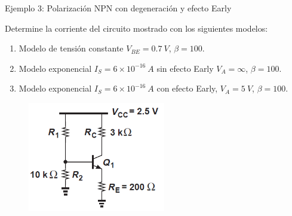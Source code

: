\documentclass[t,aspectratio=169]{beamer}
\begin{document}
\begin{frame}{Ejemplo 3: Polarización NPN con degeneración y efecto Early}

Determine la corriente del circuito mostrado con los siguientes modelos:

\begin{enumerate}
    \item Modelo de tensión constante $V_{BE} = 0.7\ V$, $\beta = 100$.
    \item Modelo exponencial $I_S = 6\times{}10^{-16}\ A$ sin efecto Early $V_A = \infty$, $\beta = 100$.
    \item Modelo exponencial $I_S = 6\times{}10^{-16}\ A$ con efecto Early, $V_A = 5\ V$, $\beta = 100$.
\end{enumerate}

\begin{figure}[H]
    \centering
    \includegraphics[width=6cm]{figuras/efecto_early_ejemplo_3.png}
\end{figure}
    
\end{frame}
\end{document}
